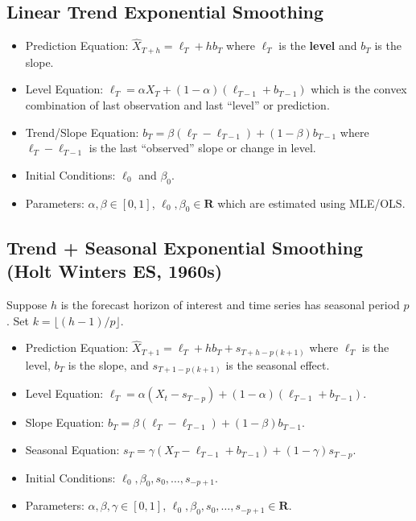 \subsection*{Linear Trend Exponential Smoothing}
\begin{itemize}
    \item Prediction Equation: $ \hat{X}_{T+h}=\ell_T+h b_T $ where $ \ell_T $
          is the \textbf{level} and $ b_T $ is the slope.
    \item Level Equation: $ \ell_T=\alpha X_T+(1-\alpha)(\ell_{T-1}+b_{T-1}) $
          which is the convex combination of last observation and last ``level''
          or prediction.
    \item Trend/Slope Equation: $ b_T=\beta(\ell_T-\ell_{T-1})+(1-\beta)b_{T-1} $
          where $ \ell_T-\ell_{T-1} $ is the last ``observed'' slope or change in level.
    \item Initial Conditions: $ \ell_0 $ and $ \beta_0 $.
    \item Parameters: $ \alpha,\beta\in[0,1] $, $ \ell_0,\beta_0\in\mathbf{R} $
          which are estimated using MLE/OLS\@.
\end{itemize}

\subsection*{Trend + Seasonal Exponential Smoothing (Holt Winters ES, 1960s)}
Suppose $ h $ is the forecast horizon of interest and time series has seasonal
period $ p $. Set $ k=\lfloor (h-1)/p\rfloor $.
\begin{itemize}
    \item Prediction Equation: $ \hat{X}_{T+1}=\ell_T+h b_T+s_{T+h-p(k+1)} $
          where $ \ell_T $ is the level, $ b_T $ is the slope, and
          $ s_{T+1-p(k+1)} $ is the seasonal effect.
    \item Level Equation: $ \ell_T=\alpha(X_t-s_{T-p})+(1-\alpha)(\ell_{T-1}+b_{T-1}) $.
    \item Slope Equation: $ b_T=\beta(\ell_T-\ell_{T-1})+(1-\beta)b_{T-1} $.
    \item Seasonal Equation: $ s_T=\gamma(X_T-\ell_{T-1}+b_{T-1})+(1-\gamma)s_{T-p} $.
    \item Initial Conditions: $ \ell_0,\beta_0,s_0,\ldots,s_{-p+1} $.
    \item Parameters: $ \alpha,\beta,\gamma\in[0,1] $, $ \ell_0,\beta_0,s_0,\ldots,s_{-p+1}\in\mathbf{R} $.
\end{itemize}

